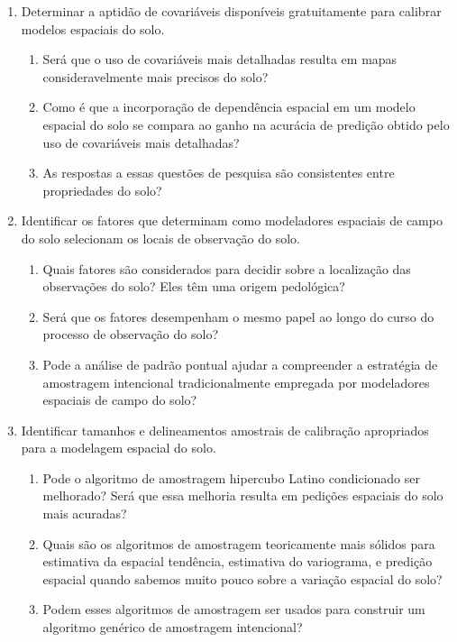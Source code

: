 \begin{enumerate}[label=(\Roman*)]
\item Determinar a aptidão de covariáveis disponíveis gratuitamente para calibrar modelos espaciais do solo.

\begin{enumerate}[label=(\alph*)]
\item Será que o uso de covariáveis mais detalhadas resulta em mapas consideravelmente mais precisos do solo?

\item Como é que a incorporação de dependência espacial em um modelo espacial do solo se compara ao ganho na 
acurácia de predição obtido pelo uso de covariáveis mais detalhadas?

\item As respostas a essas questões de pesquisa são consistentes entre propriedades do solo?
\end{enumerate}
 
\item Identificar os fatores que determinam como modeladores espaciais de campo do solo selecionam os locais 
de observação do solo.

\begin{enumerate}[label=(\alph*)]

\item Quais fatores são considerados para decidir sobre a localização das observações do solo? Eles têm uma 
origem pedológica?

\item Será que os fatores desempenham o mesmo papel ao longo do curso do processo de observação do solo?

\item Pode a análise de padrão pontual ajudar a compreender a estratégia de amostragem intencional 
tradicionalmente empregada por modeladores espaciais de campo do solo?
\end{enumerate}

\newpage

\item Identificar tamanhos e delineamentos amostrais de calibração apropriados para a modelagem espacial do 
solo.
\begin{enumerate}[label=(\alph*)]
\item Pode o algoritmo de amostragem hipercubo Latino condicionado ser melhorado? Será que essa melhoria 
resulta em pedições espaciais do solo mais acuradas?

\item Quais são os algoritmos de amostragem teoricamente mais sólidos para estimativa da espacial tendência, 
estimativa do variograma, e predição espacial quando sabemos muito pouco sobre a variação espacial do solo?

\item Podem esses algoritmos de amostragem ser usados para construir um algoritmo genérico de amostragem 
intencional?

\end{enumerate}
\end{enumerate}


